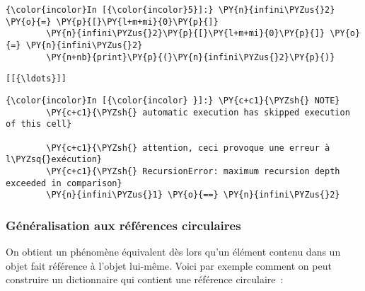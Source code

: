     \begin{Verbatim}[commandchars=\\\{\}]
{\color{incolor}In [{\color{incolor}5}]:} \PY{n}{infini\PYZus{}2} \PY{o}{=} \PY{p}{[}\PY{l+m+mi}{0}\PY{p}{]}
        \PY{n}{infini\PYZus{}2}\PY{p}{[}\PY{l+m+mi}{0}\PY{p}{]} \PY{o}{=} \PY{n}{infini\PYZus{}2}
        \PY{n+nb}{print}\PY{p}{(}\PY{n}{infini\PYZus{}2}\PY{p}{)}
\end{Verbatim}


    \begin{Verbatim}[commandchars=\\\{\}]
[[{\ldots}]]

    \end{Verbatim}

    \begin{Verbatim}[commandchars=\\\{\}]
{\color{incolor}In [{\color{incolor} }]:} \PY{c+c1}{\PYZsh{} NOTE}
        \PY{c+c1}{\PYZsh{} automatic execution has skipped execution of this cell}
        
        \PY{c+c1}{\PYZsh{} attention, ceci provoque une erreur à l\PYZsq{}exécution}
        \PY{c+c1}{\PYZsh{} RecursionError: maximum recursion depth exceeded in comparison}
        \PY{n}{infini\PYZus{}1} \PY{o}{==} \PY{n}{infini\PYZus{}2}
\end{Verbatim}


    \hypertarget{guxe9nuxe9ralisation-aux-ruxe9fuxe9rences-circulaires}{%
\subsubsection{Généralisation aux références
circulaires}\label{guxe9nuxe9ralisation-aux-ruxe9fuxe9rences-circulaires}}

    On obtient un phénomène équivalent dès lors qu'un élément contenu dans
un objet fait référence à l'objet lui-même. Voici par exemple comment on
peut construire un dictionnaire qui contient une référence circulaire~:

